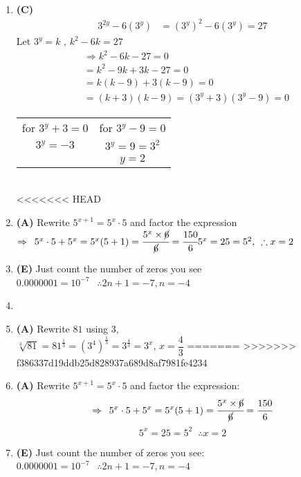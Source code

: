 \begin{multicols}{2}
\begin{enumerate}[label={\arabic*.}]
    \item \textbf{(C)} \begin{align*} 
        3^{2y} -6(3^y) & = (3^y)^2 - 6(3^y) = 27 
    \end{align*}
    Let $3^y = k$ , $k^2 - 6k = 27 $
    \begin{align*} 
            & \Rightarrow k^2 - 6k -27 = 0 \\
            & = k^2 - 9k + 3k - 27 = 0 \\
            & = k(k-9)+3(k-9) = 0 \\
        &= (k+3)(k-9) = (3^y + 3)(3^y - 9) = 0
    \end{align*}
    \begin{tabular}{c|c}
        for $3^y + 3 = 0$ & for $3^y - 9 = 0$ \\
        $3^y = -3 $& $3^y = 9 = 3^2$ \\
            & $y = 2$
    \end{tabular} \\
<<<<<<< HEAD
   
    \item \textbf{(A)} Rewrite $5^{x+1} = 5^x \cdot 5$ and factor the expression 
   $ \Rightarrow \hspace{5pt} 5^{x} \cdot 5 + 5^x = 5^x (5 + 1) = \cfrac{5^x \times \cancel{6}}{\cancel{6}} = \cfrac{150}{6} \\
    5^x = 25 = 5^2  , \hspace{5pt} \therefore x = 2$ 
    \item \textbf{(E)} Just count the number of zeros you see \\
    $0.0000001 = 10^{-7}$ $ \hspace{5pt}\therefore  2n + 1 = -7, n = -4$
    \item
    \item \textbf{(A)} Rewrite $81$ using $3$, \\ $\sqrt[3]{81} = 81^{\frac{1}{3}} = (3^4)^{\frac{1}{3}} = 3^{\frac{4}{3}} = 3^x$,  $x = \dfrac{4}{3}$
=======
>>>>>>> f386337d19ddb25d828937a689d8af7981fe4234

    \item \textbf{(A)} Rewrite \( 5^{x+1} = 5^x \cdot 5 \) and factor the expression: 
    \[\Rightarrow \hspace{5pt} 5^x \cdot 5 + 5^x = 5^x (5 + 1) = \cfrac{5^x \times \cancel{6}}{\cancel{6}} = \cfrac{150}{6}\]
    \[5^x = 25 = 5^2 \, \hspace{5pt} \therefore x = 2 \]

    \item \textbf{(E)} Just count the number of zeros you see: \\
    \( 0.0000001 = 10^{-7} \) \(\hspace{5pt}\therefore 2n + 1 = -7, n = -4 \)


\end{enumerate}
\end{multicols}
